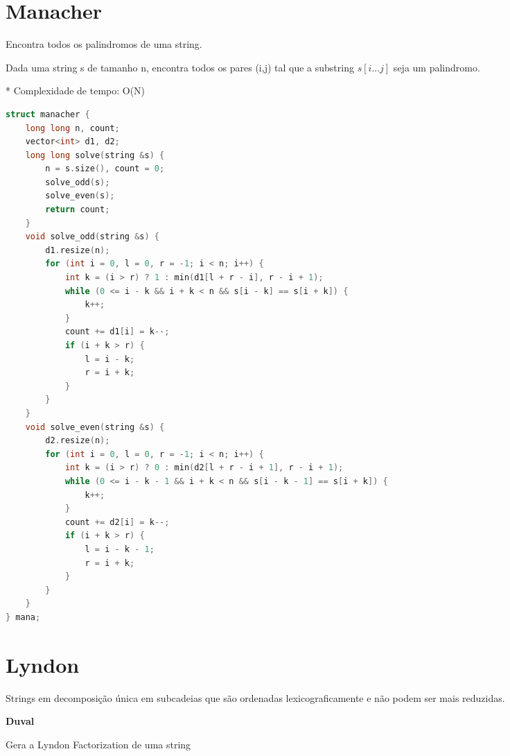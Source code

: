 \documentclass[11pt, a4paper, oneside]{book}
\begin{document}
\hfill

\section{Manacher}


Encontra todos os palindromos de uma string.



Dada uma string s de tamanho n, encontra todos os pares (i,j) tal que a substring $s[i...j]$ seja um palindromo.



* Complexidade de tempo: O(N)
\hfill

\begin{multicols}{2}
\begin{lstlisting}[language=C++]
struct manacher {
    long long n, count;
    vector<int> d1, d2;
    long long solve(string &s) {
        n = s.size(), count = 0;
        solve_odd(s);
        solve_even(s);
        return count;
    }
    void solve_odd(string &s) {
        d1.resize(n);
        for (int i = 0, l = 0, r = -1; i < n; i++) {
            int k = (i > r) ? 1 : min(d1[l + r - i], r - i + 1);
            while (0 <= i - k && i + k < n && s[i - k] == s[i + k]) {
                k++;
            }
            count += d1[i] = k--;
            if (i + k > r) {
                l = i - k;
                r = i + k;
            }
        }
    }
    void solve_even(string &s) {
        d2.resize(n);
        for (int i = 0, l = 0, r = -1; i < n; i++) {
            int k = (i > r) ? 0 : min(d2[l + r - i + 1], r - i + 1);
            while (0 <= i - k - 1 && i + k < n && s[i - k - 1] == s[i + k]) {
                k++;
            }
            count += d2[i] = k--;
            if (i + k > r) {
                l = i - k - 1;
                r = i + k;
            }
        }
    }
} mana;
\end{lstlisting}
\end{multicols}

\hfill

\section{Lyndon}


Strings em decomposição única em subcadeias que são ordenadas lexicograficamente e não podem ser mais reduzidas.



\textbf{Duval} 



Gera a Lyndon Factorization de uma string
\end{document}
